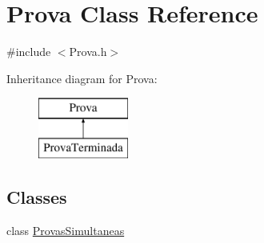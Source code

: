 \hypertarget{class_prova}{}\section{Prova Class Reference}
\label{class_prova}


{\ttfamily \#include $<$Prova.\+h$>$}

Inheritance diagram for Prova\+:\begin{figure}[H]
\begin{center}
\leavevmode
\includegraphics[height=2.000000cm]{class_prova}
\end{center}
\end{figure}
\subsection*{Classes}
\begin{DoxyCompactItemize}
\item 
class \hyperlink{class_prova_1_1_provas_simultaneas}{Provas\+Simultaneas}
\end{DoxyCompactItemize}
